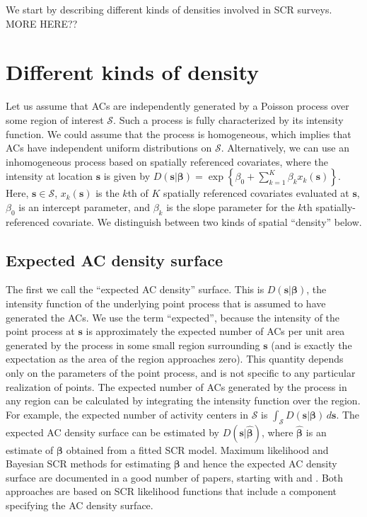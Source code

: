 \documentclass[useAMS,usenatbib,referee]{biom}
\begin{document}
We start by describing different kinds of densities involved in SCR surveys. MORE HERE??

\section{Different kinds of density}\label{different-densities}

Let us assume that ACs are independently generated by a Poisson process over some region of interest $\mathcal{S}$. Such a process is fully characterized by its intensity function. We could assume that the process is homogeneous, which implies that ACs have independent uniform distributions on $\mathcal{S}$. Alternatively, we can use an inhomogeneous process based on spatially referenced covariates, where the intensity at location $\bm{s}$ is given by $D(\bm{s}|\bm{\beta})=\exp\left\{\beta_0 + \sum_{k=1}^K\beta_kx_k(\bm{s})\right\}$. Here, $\bm{s} \in \mathcal{S}$, $x_k(\bm{s})$ is the $k$th of $K$ spatially referenced covariates evaluated at $\bm{s}$, $\beta_0$ is an intercept parameter, and $\beta_k$ is the slope parameter for the $k$th spatially-referenced covariate. We distinguish between two kinds of spatial ``density'' below. 

\subsection{Expected AC density surface} \label{s:eacd}

The first we call the ``expected AC density'' surface. This is $D(\bm{s}|\bm{\beta})$, the intensity function of the underlying point process that is assumed to have generated the ACs. We use the term ``expected'', because the intensity of the point process at $\bm{s}$ is approximately the expected number of ACs per unit area generated by the process in some small region surrounding $\bm{s}$ (and is exactly the expectation as the area of the region approaches zero). This quantity depends only on the parameters of the point process, and is not specific to any particular realization of points. The expected number of ACs generated by the process in any region can be calculated by integrating the intensity function over the region. For example, the expected number of activity centers in $\mathcal{S}$ is $\int_{\mathcal{S}} D(\bm{s}|\bm{\beta}) \, d\bm{s}$. The expected AC density surface can be estimated by $D(\bm{s}|\hat{\bm{\beta}})$, where $\hat{\bm{\beta}}$ is an estimate of $\bm{\beta}$ obtained from a fitted SCR model. Maximum likelihood and Bayesian SCR methods for estimating $\bm{\beta}$ and hence the expected AC density surface are documented in a good number of papers, starting with \cite{Borchers+Efford:08} and \cite{Royle+Young:08}. Both approaches are based on SCR likelihood functions that include a component specifying the AC density surface. 
\end{document}
